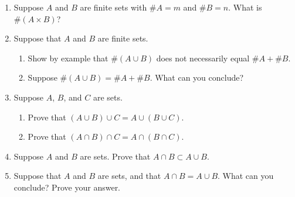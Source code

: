 \begin{enumerate}
  \item Suppose $A$ and $B$ are finite sets with $\# A = m$ and $\# B = n$. What is $\# (A \times B)$?

  \item Suppose that $A$ and $B$ are finite sets.
\begin{enumerate}
    \item Show by example that $\# (A \cup B)$ does not necessarily equal $\# A + \# B$.
    \item Suppose $\# (A \cup B) = \# A + \# B$. What can you conclude?
\end{enumerate}

  \item Suppose $A$, $B$, and $C$ are sets.
\begin{enumerate}
    \item Prove that $(A \cup B) \cup C = A \cup (B \cup C)$.
    \item Prove that $(A \cap B) \cap C = A \cap (B \cap C)$.
\end{enumerate}

  \item Suppose $A$ and $B$ are sets. Prove that $A \cap B \subset A \cup B$.

  \item Suppose that $A$ and $B$ are sets, and that $A \cap B = A \cup B$. What can you conclude? Prove your answer.
\end{enumerate}
